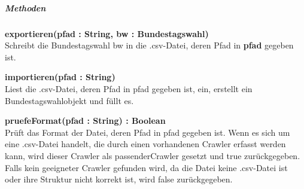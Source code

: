 \documentclass[10pt,a4paper]{article}
\begin{document}
\subparagraph{Methoden}
\begin{description}
\item \textbf {exportieren(pfad : String, bw : Bundestagswahl)} \\
Schreibt die Bundestagswahl bw in die .csv-Datei, deren Pfad in \textbf{pfad} gegeben ist.
\item \textbf {importieren(pfad : String)} \\
Liest die .csv-Datei, deren Pfad in pfad gegeben ist, ein, erstellt ein Bundestagswahlobjekt und füllt es.
\item \textbf{pruefeFormat(pfad : String) : Boolean} \\
Prüft das Format der Datei, deren Pfad in pfad gegeben ist. Wenn es sich um eine .csv-Datei handelt, die durch einen vorhandenen Crawler erfasst werden kann, wird dieser Crawler als passenderCrawler gesetzt und true zurückgegeben. Falls kein geeigneter Crawler gefunden wird, da die Datei keine .csv-Datei ist oder ihre Struktur nicht korrekt ist, wird false zurückgegeben.

\end{description}
\end{document}
